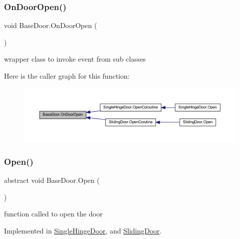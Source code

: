 \subsubsection{\texorpdfstring{On\+Door\+Open()}{OnDoorOpen()}}
{\footnotesize\ttfamily void Base\+Door.\+On\+Door\+Open (\begin{DoxyParamCaption}{ }\end{DoxyParamCaption})\hspace{0.3cm}{\ttfamily [protected]}}



wrapper class to invoke event from sub classes 

Here is the caller graph for this function\+:
\nopagebreak
\begin{figure}[H]
\begin{center}
\leavevmode
\includegraphics[width=350pt]{class_base_door_af53bd804dcee24b1f2019c2d2e8e03c6_icgraph}
\end{center}
\end{figure}
\mbox{\label{class_base_door_a418df6f73cc5c56b6989c0512a6a909b}} 
\subsubsection{\texorpdfstring{Open()}{Open()}}
{\footnotesize\ttfamily abstract void Base\+Door.\+Open (\begin{DoxyParamCaption}{ }\end{DoxyParamCaption})\hspace{0.3cm}{\ttfamily [pure virtual]}}



function called to open the door 



Implemented in \mbox{\hyperlink{class_single_hinge_door_ad48e670701a9e9d35f97de3b8ff36208}{Single\+Hinge\+Door}}, and \mbox{\hyperlink{class_sliding_door_aaf090e96cc143eb5ed3eaf875045efc9}{Sliding\+Door}}.

